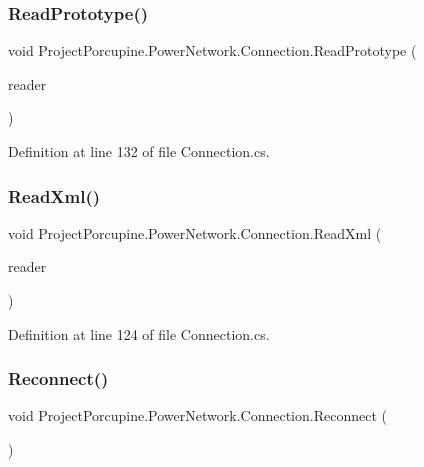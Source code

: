 \subsubsection{\texorpdfstring{Read\+Prototype()}{ReadPrototype()}}
{\footnotesize\ttfamily void Project\+Porcupine.\+Power\+Network.\+Connection.\+Read\+Prototype (\begin{DoxyParamCaption}\item[{Xml\+Reader}]{reader }\end{DoxyParamCaption})}



Definition at line 132 of file Connection.\+cs.

\mbox{\label{class_project_porcupine_1_1_power_network_1_1_connection_aea6a9f9e413484f24a19c378f74a3500}} 
\subsubsection{\texorpdfstring{Read\+Xml()}{ReadXml()}}
{\footnotesize\ttfamily void Project\+Porcupine.\+Power\+Network.\+Connection.\+Read\+Xml (\begin{DoxyParamCaption}\item[{Xml\+Reader}]{reader }\end{DoxyParamCaption})}



Definition at line 124 of file Connection.\+cs.

\mbox{\label{class_project_porcupine_1_1_power_network_1_1_connection_ad3278a48cfb6938feae85814bf0c709b}} 
\subsubsection{\texorpdfstring{Reconnect()}{Reconnect()}}
{\footnotesize\ttfamily void Project\+Porcupine.\+Power\+Network.\+Connection.\+Reconnect (\begin{DoxyParamCaption}{ }\end{DoxyParamCaption})}




